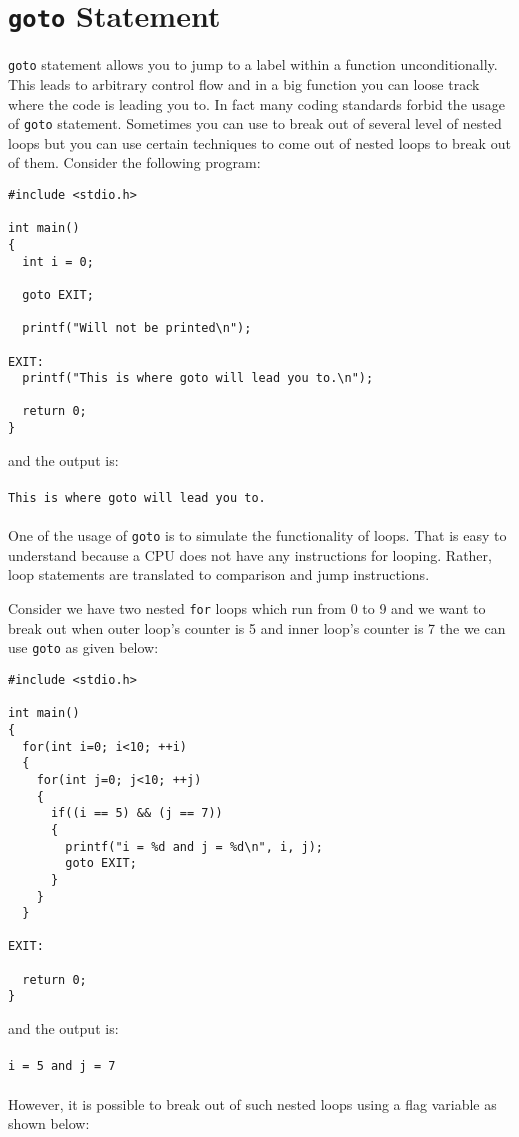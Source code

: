 \section{\texttt{goto} Statement}
\texttt{goto} statement allows you to jump to a label within a function
unconditionally. This leads to arbitrary control flow and in a big function you
can loose track where the code is leading you to. In fact many coding standards
forbid the usage of \texttt{goto} statement. Sometimes you can use to break out
of several level of nested loops but you can use certain techniques to come out
of nested loops to break out of them. Consider the following program:

\begin{verbatim}
#include <stdio.h>

int main()
{
  int i = 0;
  
  goto EXIT;

  printf("Will not be printed\n");
  
EXIT:
  printf("This is where goto will lead you to.\n");

  return 0;
}
\end{verbatim}
and the output is:
\\\\\texttt{This is where goto will lead you to.\\\\}
One of the usage of \texttt{goto} is to simulate the functionality of
loops. That is easy to understand because a CPU does not have any instructions
for looping. Rather, loop statements are translated to comparison and jump
instructions.

Consider we have two nested \texttt{for} loops which run from 0 to 9 and we
want to break out when outer loop's counter is 5 and inner loop's counter is 7
the we can use \texttt{goto} as given below:

\begin{verbatim}
#include <stdio.h>

int main()
{
  for(int i=0; i<10; ++i)
  {
    for(int j=0; j<10; ++j)
    {
      if((i == 5) && (j == 7))
      {
        printf("i = %d and j = %d\n", i, j);
        goto EXIT;
      }
    }
  }

EXIT:

  return 0;
}
\end{verbatim}
and the output is:
\\\\\texttt{i = 5 and j = 7\\\\}
However, it is possible to break out of such nested loops using a flag variable
as shown below:

